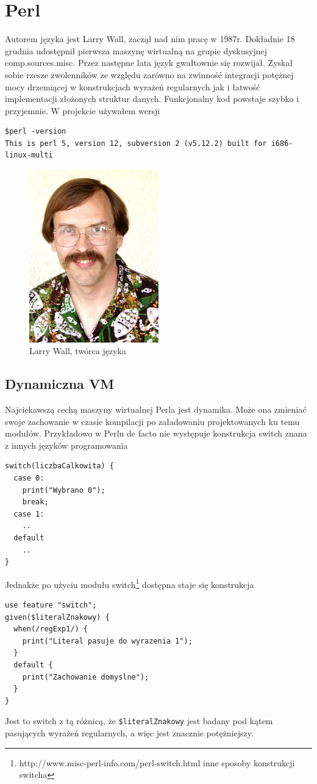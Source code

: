 \documentclass[a4paper,12pt]{article}
\begin{document}
\newpage
\section{Perl}
Autorem języka jest Larry Wall, zaczął nad nim pracę w 1987r. Dokładnie 18 grudnia udostępnił pierwsza maszynę wirtualną na grupie dyskusyjnej comp.sources.misc. Przez następne lata język gwałtownie się rozwijał. Zyskał sobie rzesze zwolenników ze względu zarówno na zwinność integracji potężnej mocy drzemiącej w konstrukcjach wyrażeń regularnych jak i łatwość implementacji złożonych struktur danych. Funkcjonalny kod powstaje szybko i przyjemnie. W projekcie używałem wersji
\begin{verbatim}
$perl -version
This is perl 5, version 12, subversion 2 (v5.12.2) built for i686-linux-multi
\end{verbatim}
\begin{figure}[h!]
  \centering
    \includegraphics[width=0.5\textwidth]{grafika/larry_wall.jpg}
  \caption{Larry Wall, twórca języka}
\end{figure}

\newpage
\subsection{Dynamiczna VM}
Najciekawszą cechą maszyny wirtualnej Perla jest dynamika. Może ona zmieniać swoje zachowanie w czasie kompilacji po załadowaniu projektowanych ku temu modułów. Przykładowo w Perlu de facto nie występuje konstrukcja switch znana z innych języków programowania
\begin{verbatim}
switch(liczbaCalkowita) {
  case 0:
    print("Wybrano 0");
    break;
  case 1:
    ..
  default
    ..
}
\end{verbatim}
Jednakże po użyciu modułu switch\footnote{http://www.misc-perl-info.com/perl-switch.html inne sposoby konstrukcji switcha} dostępna staje się konstrukcja
\begin{verbatim}
use feature "switch";
given($literalZnakowy) {
  when(/regExp1/) {
    print("Literal pasuje do wyrazenia 1");
  }
  default {
    print("Zachowanie domyslne");
  }
}
\end{verbatim}
Jest to switch z tą różnicą, że \verb|$literalZnakowy| jest badany pod kątem pasujących wyrażeń regularnych, a więc jest znacznie potężniejszy.
\end{document}
